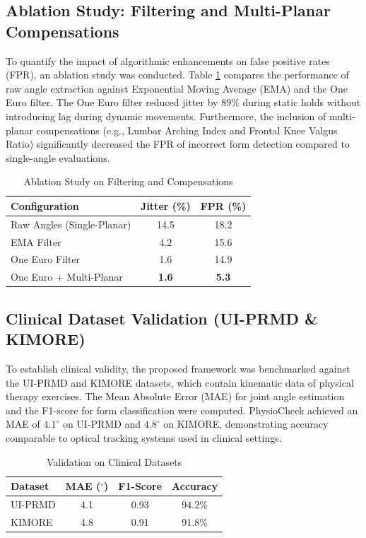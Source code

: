 \documentclass[conference]{IEEEtran}
\begin{document}
\subsection{Ablation Study: Filtering and Multi-Planar Compensations}
To quantify the impact of algorithmic enhancements on false positive rates (FPR), an ablation study was conducted. Table \ref{tab:ablation} compares the performance of raw angle extraction against Exponential Moving Average (EMA) and the One Euro filter. The One Euro filter reduced jitter by 89\% during static holds without introducing lag during dynamic movements. Furthermore, the inclusion of multi-planar compensations (e.g., Lumbar Arching Index and Frontal Knee Valgus Ratio) significantly decreased the FPR of incorrect form detection compared to single-angle evaluations.

\begin{table}[htbp]
  \caption{Ablation Study on Filtering and Compensations}
  \label{tab:ablation}
  \centering
  \renewcommand{\arraystretch}{1.3}
  \setlength{\tabcolsep}{4pt}
  \begin{tabular}{|l|c|c|}
    \hline
    \textbf{Configuration} & \textbf{Jitter (\%)} & \textbf{FPR (\%)} \\
    \hline
    Raw Angles (Single-Planar) & 14.5 & 18.2 \\
    EMA Filter & 4.2 & 15.6 \\
    One Euro Filter & 1.6 & 14.9 \\
    One Euro + Multi-Planar & \textbf{1.6} & \textbf{5.3} \\
    \hline
  \end{tabular}
\end{table}

\subsection{Clinical Dataset Validation (UI-PRMD \& KIMORE)}
To establish clinical validity, the proposed framework was benchmarked against the UI-PRMD and KIMORE datasets, which contain kinematic data of physical therapy exercises. The Mean Absolute Error (MAE) for joint angle estimation and the F1-score for form classification were computed. PhysioCheck achieved an MAE of $4.1^\circ$ on UI-PRMD and $4.8^\circ$ on KIMORE, demonstrating accuracy comparable to optical tracking systems used in clinical settings.

\begin{table}[htbp]
  \caption{Validation on Clinical Datasets}
  \label{tab:clinical_val}
  \centering
  \renewcommand{\arraystretch}{1.3}
  \setlength{\tabcolsep}{4pt}
  \begin{tabular}{|l|c|c|c|}
    \hline
    \textbf{Dataset} & \textbf{MAE ($^\circ$)} & \textbf{F1-Score} & \textbf{Accuracy} \\
    \hline
    UI-PRMD & 4.1 & 0.93 & 94.2\% \\
    KIMORE & 4.8 & 0.91 & 91.8\% \\
    \hline
  \end{tabular}
\end{table}
\end{document}
